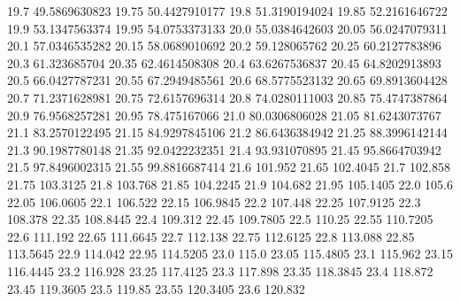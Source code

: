            19.7    49.5869630823
          19.75    50.4427910177
           19.8    51.3190194024
          19.85    52.2161646722
           19.9    53.1347563374
          19.95    54.0753373133
           20.0    55.0384642603
          20.05    56.0247079311
           20.1    57.0346535282
          20.15    58.0689010692
           20.2     59.128065762
          20.25    60.2127783896
           20.3     61.323685704
          20.35    62.4614508308
           20.4    63.6267536837
          20.45    64.8202913893
           20.5    66.0427787231
          20.55    67.2949485561
           20.6    68.5775523132
          20.65    69.8913604428
           20.7    71.2371628981
          20.75    72.6157696314
           20.8    74.0280111003
          20.85    75.4747387864
           20.9    76.9568257281
          20.95     78.475167066
           21.0    80.0306806028
          21.05    81.6243073767
           21.1    83.2570122495
          21.15    84.9297845106
           21.2    86.6436384942
          21.25    88.3996142144
           21.3    90.1987780148
          21.35    92.0422232351
           21.4     93.931070895
          21.45    95.8664703942
           21.5    97.8496002315
          21.55    99.8816687414
           21.6          101.952
          21.65         102.4045
           21.7          102.858
          21.75         103.3125
           21.8          103.768
          21.85         104.2245
           21.9          104.682
          21.95         105.1405
           22.0            105.6
          22.05         106.0605
           22.1          106.522
          22.15         106.9845
           22.2          107.448
          22.25         107.9125
           22.3          108.378
          22.35         108.8445
           22.4          109.312
          22.45         109.7805
           22.5           110.25
          22.55         110.7205
           22.6          111.192
          22.65         111.6645
           22.7          112.138
          22.75         112.6125
           22.8          113.088
          22.85         113.5645
           22.9          114.042
          22.95         114.5205
           23.0            115.0
          23.05         115.4805
           23.1          115.962
          23.15         116.4445
           23.2          116.928
          23.25         117.4125
           23.3          117.898
          23.35         118.3845
           23.4          118.872
          23.45         119.3605
           23.5           119.85
          23.55         120.3405
           23.6          120.832

